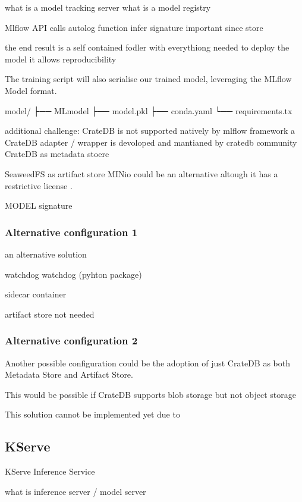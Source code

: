 what is a model tracking server
what is a model registry



Mlflow API calls
autolog function
infer signature 
important since store 

the end result is a self contained fodler with everythiong needed to deploy the model
it allows reproducibility 

The training script will also serialise our trained model, leveraging the MLflow Model format.


model/
├── MLmodel
├── model.pkl
├── conda.yaml
└── requirements.tx


additional challenge: CrateDB is not supported natively by mlflow framework
a CrateDB adapter / wrapper is devoloped and mantianed by cratedb community
CrateDB as metadata stoere


SeaweedFS as artifact store
MINio could be an alternative altough it has a restrictive license \cite{minio_license}.



MODEL signature




\subsubsection{Alternative configuration 1}

an alternative solution

watchdog
watchdog (pyhton package)

sidecar container

artifact store not needed

\subsubsection{Alternative configuration 2}

Another possible configuration could be the adoption of just CrateDB as both Metadata Store and Artifact Store.

This would be possible if
CrateDB supports blob storage but not object storage

This solution cannot be implemented yet due to 


\subsection{KServe}


KServe Inference Service

what is
inference server / model server


